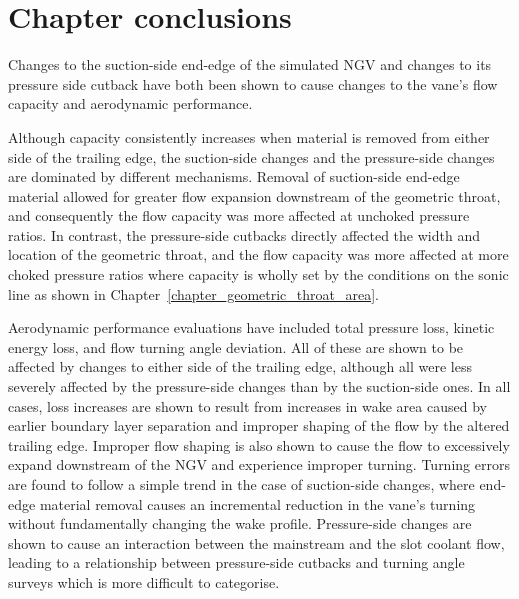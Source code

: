 \documentclass[a4paper, 11pt, oneside]{report}
\begin{document}
\section{Chapter conclusions}

Changes to the suction-side end-edge of the simulated NGV and changes to its pressure side cutback have both been shown to cause changes to the vane's flow capacity and aerodynamic performance. 

Although capacity consistently increases when material is removed from either side of the trailing edge, the suction-side changes and the pressure-side changes are dominated by different mechanisms. Removal of suction-side end-edge material allowed for greater flow expansion downstream of the geometric throat, and consequently the flow capacity was more affected at unchoked pressure ratios. In contrast, the pressure-side cutbacks directly affected the width and location of the geometric throat, and the flow capacity was more affected at more choked pressure ratios where capacity is wholly set by the conditions on the sonic line as shown in Chapter~\ref{chapter_geometric_throat_area}.

Aerodynamic performance evaluations have included total pressure loss, kinetic energy loss, and flow turning angle deviation. All of these are shown to be affected by changes to either side of the trailing edge, although all were less severely affected by the pressure-side changes than by the suction-side ones. In all cases, loss increases are shown to result from increases in wake area caused by earlier boundary layer separation and improper shaping of the flow by the altered trailing edge. Improper flow shaping is also shown to cause the flow to excessively expand downstream of the NGV and experience improper turning. Turning errors are found to follow a simple trend in the case of suction-side changes, where end-edge material removal causes an incremental reduction in the vane's turning without fundamentally changing the wake profile. Pressure-side changes are shown to cause an interaction between the mainstream and the slot coolant flow, leading to a relationship between pressure-side cutbacks and turning angle surveys which is more difficult to categorise.
\end{document}
